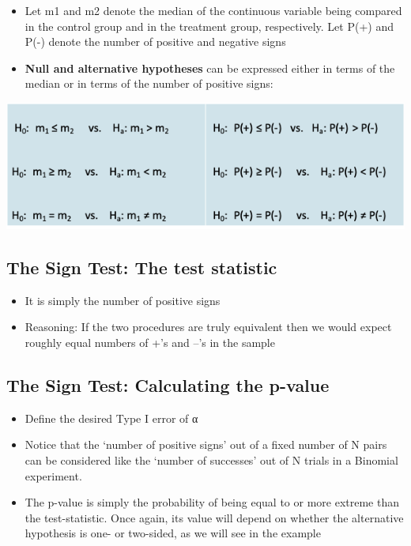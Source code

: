 \documentclass[
]{book}
\providecommand{\tightlist}{%
  \setlength{\itemsep}{0pt}\setlength{\parskip}{0pt}}
\begin{document}
\begin{itemize}
\tightlist
\item
  Let m1 and m2 denote the median of the continuous variable being compared in the control group and in the treatment group, respectively. Let P(+) and P(-) denote the number of positive and negative signs
\item
  \textbf{Null and alternative hypotheses} can be expressed either in terms of the median or in terms of the number of positive signs:
\end{itemize}

\includegraphics[width=1\linewidth]{./9_11}

\hypertarget{the-sign-test-the-test-statistic}{%
\subsection{The Sign Test: The test statistic}\label{the-sign-test-the-test-statistic}}

\begin{itemize}
\tightlist
\item
  It is simply the number of positive signs
\item
  Reasoning: If the two procedures are truly equivalent then we would expect roughly equal numbers of +'s and --'s in the sample
\end{itemize}

\hypertarget{the-sign-test-calculating-the-p-value}{%
\subsection{The Sign Test: Calculating the p-value}\label{the-sign-test-calculating-the-p-value}}

\begin{itemize}
\tightlist
\item
  Define the desired Type I error of α
\item
  Notice that the `number of positive signs' out of a fixed number of N pairs can be considered like the `number of successes' out of N trials in a Binomial experiment.
\item
  The p-value is simply the probability of being equal to or more extreme than the test-statistic. Once again, its value will depend on whether the alternative hypothesis is one- or two-sided, as we will see in the example
\end{itemize}
\end{document}
